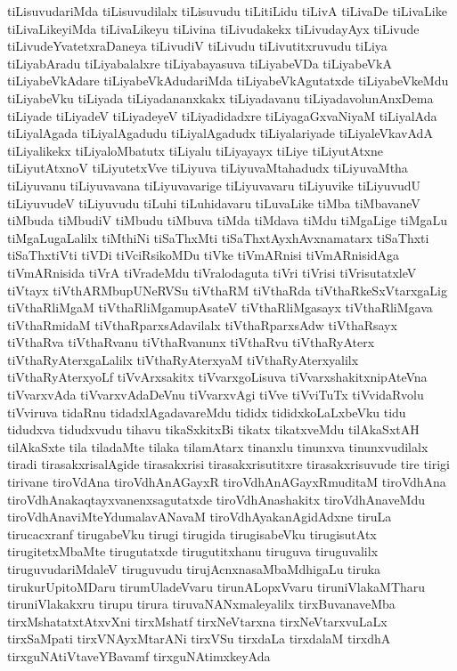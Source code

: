 {tiLisuvudariMda
tiLisuvudilalx
tiLisuvudu
tiLitiLidu
tiLivA
tiLivaDe
tiLivaLike
tiLivaLikeyiMda
tiLivaLikeyu
tiLivina
tiLivudakekx
tiLivudayAyx
tiLivude
tiLivudeYvatetxraDaneya
tiLivudiV
tiLivudu
tiLivutitxruvudu
tiLiya
tiLiyabAradu
tiLiyabalalxre
tiLiyabayasuva
tiLiyabeVDa
tiLiyabeVkA
tiLiyabeVkAdare
tiLiyabeVkAdudariMda
tiLiyabeVkAgutatxde
tiLiyabeVkeMdu
tiLiyabeVku
tiLiyada
tiLiyadananxkakx
tiLiyadavanu
tiLiyadavolunAnxDema
tiLiyade
tiLiyadeV
tiLiyadeyeV
tiLiyadidadxre
tiLiyagaGxvaNiyaM
tiLiyalAda
tiLiyalAgada
tiLiyalAgadudu
tiLiyalAgadudx
tiLiyalariyade
tiLiyaleVkavAdA
tiLiyalikekx
tiLiyaloMbatutx
tiLiyalu
tiLiyayayx
tiLiye
tiLiyutAtxne
tiLiyutAtxnoV
tiLiyutetxVve
tiLiyuva
tiLiyuvaMtahadudx
tiLiyuvaMtha
tiLiyuvanu
tiLiyuvavana
tiLiyuvavarige
tiLiyuvavaru
tiLiyuvike
tiLiyuvudU
tiLiyuvudeV
tiLiyuvudu
tiLuhi
tiLuhidavaru
tiLuvaLike
tiMba
tiMbavaneV
tiMbuda
tiMbudiV
tiMbudu
tiMbuva
tiMda
tiMdava
tiMdu
tiMgaLige
tiMgaLu
tiMgaLugaLalilx
tiMthiNi
tiSaThxMti
tiSaThxtAyxhAvxnamatarx
tiSaThxti
tiSaThxtiVti
tiVDi
tiVciRsikoMDu
tiVke
tiVmARnisi
tiVmARnisidAga
tiVmARnisida
tiVrA
tiVradeMdu
tiVralodaguta
tiVri
tiVrisi
tiVrisutatxleV
tiVtayx
tiVthARMbupUNeRVSu
tiVthaRM
tiVthaRda
tiVthaRkeSxVtarxgaLig
tiVthaRliMgaM
tiVthaRliMgamupAsateV
tiVthaRliMgasayx
tiVthaRliMgava
tiVthaRmidaM
tiVthaRparxsAdavilalx
tiVthaRparxsAdw
tiVthaRsayx
tiVthaRva
tiVthaRvanu
tiVthaRvanunx
tiVthaRvu
tiVthaRyAterx
tiVthaRyAterxgaLalilx
tiVthaRyAterxyaM
tiVthaRyAterxyalilx
tiVthaRyAterxyoLf
tiVvArxsakitx
tiVvarxgoLisuva
tiVvarxshakitxnipAteVna
tiVvarxvAda
tiVvarxvAdaDeVnu
tiVvarxvAgi
tiVve
tiVviTuTx
tiVvidaRvolu
tiVviruva
tidaRnu
tidadxlAgadavareMdu
tididx
tididxkoLaLxbeVku
tidu
tidudxva
tidudxvudu
tihavu
tikaSxkitxBi
tikatx
tikatxveMdu
tilAkaSxtAH
tilAkaSxte
tila
tiladaMte
tilaka
tilamAtarx
tinanxlu
tinunxva
tinunxvudilalx
tiradi
tirasakxrisalAgide
tirasakxrisi
tirasakxrisutitxre
tirasakxrisuvude
tire
tirigi
tirivane
tiroVdAna
tiroVdhAnAGayxR
tiroVdhAnAGayxRmuditaM
tiroVdhAna
tiroVdhAnakaqtayxvanenxsagutatxde
tiroVdhAnashakitx
tiroVdhAnaveMdu
tiroVdhAnaviMteYdumalavANavaM
tiroVdhAyakanAgidAdxne
tiruLa
tirucacxranf
tirugabeVku
tirugi
tirugida
tirugisabeVku
tirugisutAtx
tirugitetxMbaMte
tirugutatxde
tirugutitxhanu
tiruguva
tiruguvalilx
tiruguvudariMdaleV
tiruguvudu
tirujAcnxnasaMbaMdhigaLu
tiruka
tirukurUpitoMDaru
tirumUladeVvaru
tirunALopxVvaru
tiruniVlakaMTharu
tiruniVlakakxru
tirupu
tirura
tiruvaNANxmaleyalilx
tirxBuvanaveMba
tirxMshatatxtAtxvXni
tirxMshatf
tirxNeVtarxna
tirxNeVtarxvuLaLx
tirxSaMpati
tirxVNAyxMtarANi
tirxVSu
tirxdaLa
tirxdalaM
tirxdhA
tirxguNAtiVtaveYBavamf
tirxguNAtimxkeyAda
}
